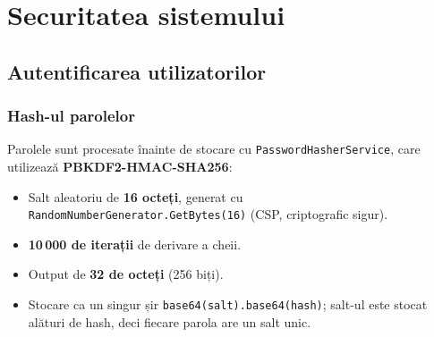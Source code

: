 
\section{Securitatea sistemului}
\label{sec:securitate}

\subsection{Autentificarea utilizatorilor}

\subsubsection{Hash-ul parolelor}

Parolele sunt procesate înainte de stocare cu \texttt{PasswordHasherService},
care utilizează \textbf{PBKDF2-HMAC-SHA256}:

\begin{itemize}
  \item Salt aleatoriu de \textbf{16 octeți}, generat cu
        \texttt{RandomNumberGenerator.GetBytes(16)} (CSP, criptografic sigur).
  \item \textbf{10\,000 de iterații} de derivare a cheii.
  \item Output de \textbf{32 de octeți} (256 biți).
  \item Stocare ca un singur șir \texttt{base64(salt).base64(hash)};
        salt-ul este stocat alături de hash, deci fiecare parola are un
        salt unic.
\end{itemize}

